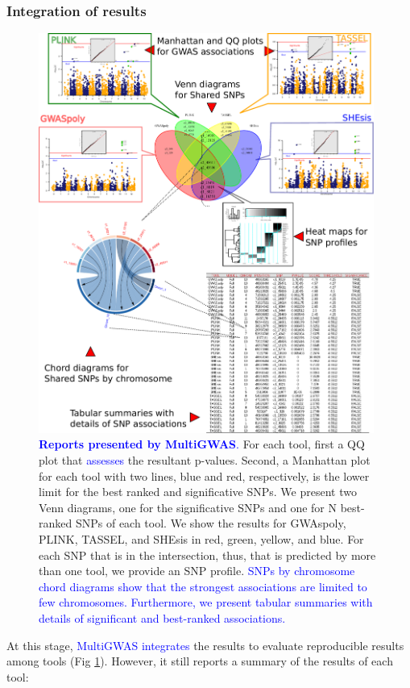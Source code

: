\documentclass{article}
\begin{document}
\subsubsection{Integration of results}
\begin{figure}
\includegraphics[width=11cm]{images/report-methodologies-all-plots} \caption{\textbf{\textcolor{blue}{Reports presented by MultiGWAS}}\textcolor{blue}{.} For each tool, first a QQ plot that \textcolor{blue}{assesses} the resultant p-values. Second, a Manhattan plot for each tool with two lines, blue and red, respectively, is the lower limit for the best ranked and significative SNPs. We present two Venn diagrams, one for the significative SNPs and one for N best-ranked SNPs of each tool. We show the results for GWAspoly, PLINK, TASSEL, and SHEsis in red, green, yellow, and blue. For each SNP that is in the intersection, thus, that is predicted by more than one tool, we provide an SNP profile. \textcolor{blue}{SNPs by chromosome chord diagrams show that the strongest associations are limited to few chromosomes. Furthermore, we present tabular summaries with details of significant and best-ranked associations. }\label{fig:Reports} }
\end{figure}
At this stage, \textcolor{blue}{MultiGWAS integrates} the results to evaluate reproducible results among tools (Fig \ref{fig:Reports}). However, it still reports a summary of the results of each tool: 
\end{document}
